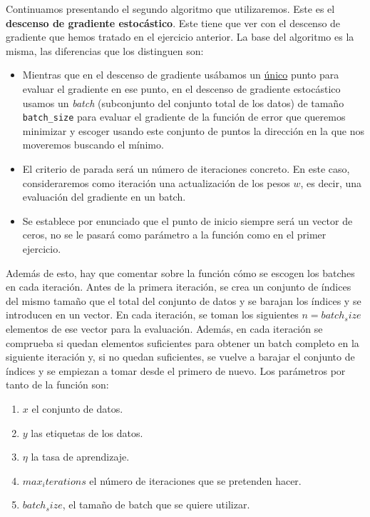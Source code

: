 \documentclass[12pt]{scrartcl}
\begin{document}
{Continuamos presentando el segundo algoritmo que utilizaremos. Este es el \textbf{descenso de gradiente estocástico}. Este tiene que ver con el descenso de gradiente que hemos tratado en el ejercicio anterior. La base del algoritmo
es la misma, las diferencias que los distinguen son:
\begin{itemize}
  \item Mientras que en el descenso de gradiente usábamos un \underline{único} punto para evaluar el gradiente en ese punto, en el descenso de gradiente estocástico usamos un \emph{batch} (subconjunto del conjunto total de los datos) de tamaño \lstinline{batch_size} para evaluar el gradiente de la función de
  error que queremos minimizar y escoger usando este conjunto de puntos la dirección en la que nos moveremos buscando el mínimo.
  \item El criterio de parada será un número de iteraciones concreto. En este caso, consideraremos como iteración una actualización de los pesos $w$, es decir, una evaluación del gradiente en un batch.
  \item Se establece por enunciado que el punto de inicio siempre será un vector de ceros, no se le pasará como parámetro a la función como en el primer ejercicio.
\end{itemize}

Además de esto, hay que comentar sobre la función cómo se escogen los batches en cada iteración. Antes de la primera iteración, se crea un conjunto de índices del mismo tamaño que el total del conjunto de datos y se barajan los índices y se introducen en un vector. En cada iteración,
se toman los siguientes $n = batch_size$ elementos de ese vector para la evaluación. Además, en cada iteración se comprueba si quedan elementos suficientes para obtener un batch completo en la siguiente iteración y, si no quedan suficientes, se vuelve a barajar el conjunto de índices y se empiezan
a tomar desde el primero de nuevo. Los parámetros por tanto de la función son:
\begin{enumerate}
  \item $x$ el conjunto de datos.
  \item $y$ las etiquetas de los datos.
  \item $\eta$ la tasa de aprendizaje.
  \item $max_iterations$ el número de iteraciones que se pretenden hacer.
  \item $batch_size$, el tamaño de batch que se quiere utilizar.
\end{enumerate}

}
\end{document}
